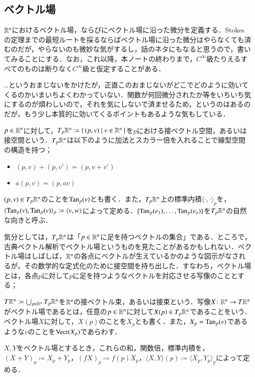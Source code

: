 \subsection{ベクトル場}

$\mathbb{R}^n$におけるベクトル場，ならびにベクトル場に沿った微分を定義する．Stokes の定理までの最短ルートを採るならばベクトル場に沿った微分はやらなくても済むのだが，やらないのも微妙な気がするし，話のネタにもなると思うので，書いてみることにする．なお，これ以降，本ノートの終わりまで，$C^\infty$級たりえるすべてのものは断りなく$C^\infty$級と仮定することがある．


\begin{que}[**]
…というおまじないをかけたが，正直このおまじないがどこでどのように効いてくるのかいまいちよくわかっていない．関数が何回微分されたか等をいちいち気にするのが煩わしいので，それを気にしないで済ませるため，というのはあるのだが，もう少し本質的に効いてくるポイントもあるような気もしている．
\end{que}

\begin{defi}
$p \in \mathbb{R}^n$に対して，$T_p \mathbb{R}^n \coloneqq \set{(p,v)| v \in \mathbb{R}^n}$を$p$における接ベクトル空間，あるいは接空間という．$T_p \mathbb{R}^n$は以下のように加法とスカラー倍を入れることで線型空間の構造を持つ；
\begin{itemize}
\item $(p, v) + (p, v') = (p, v+v')$
\item $a(p,v) = (p, av)$
\end{itemize}
$(p,v) \in T_p \mathbb{R}^n$のことを$\operatorname{Tan}_p(v)$とも書く．また，$T_p \mathbb{R}^n$上の標準内積$\langle \cdot, \cdot \rangle_p$を，$\langle \operatorname{Tan}_p(v), \operatorname{Tan}_p(v) \rangle_p \coloneqq \langle v, w \rangle$によって定める．$[\operatorname{Tan}_p(e_1), \dots, \operatorname{Tan}_p(e_n)]$を$T_p \mathbb{R}^n$の自然な向きと呼ぶ．
\end{defi}

気分としては，$T_p \mathbb{R}^n$は「$p \in \mathbb{R}^n$に足を持つベクトルの集合」である．ところで，古典ベクトル解析でベクトル場というものを見たことがあるかもしれない．ベクトル場はしばしば，$\mathbb{R}^n$の各点にベクトルが生えているかのような図示がなされるが，その数学的な定式化のために接空間を持ち出した．すなわち，ベクトル場とは，各点$p$に対して$p$に足を持つようなベクトルを対応させる写像のこととする；

\begin{defi}
$T\mathbb{R}^n \coloneqq \bigcup_{p \in \mathbb{R}^n} T_p \mathbb{R}^n$を$\mathbb{R}^n$の接ベクトル束，あるいは接束という．写像$X \colon \mathbb{R}^n \to T \mathbb{R}^n$がベクトル場であるとは，任意の$p \in \mathbb{R}^n$に対して$X(p) \in T_p \mathbb{R}^n$であることをいう．ベクトル場$X$に対して，$X(p)$のことを$X_p$とも書く．また，$X_p = \operatorname{Tan}_p(v)$であるような$v$のことを$\operatorname{Vect}(X_p)$であらわす．

$X,Y$をベクトル場とするとき，これらの和，関数倍，標準内積を，$(X+Y)_p \coloneqq X_p + Y_p$，$(fX)_p \coloneqq f(p) X_p$，$\langle X, Y \rangle (p) \coloneqq \langle X_p, Y_p \rangle_p$によって定める．
\end{defi}

